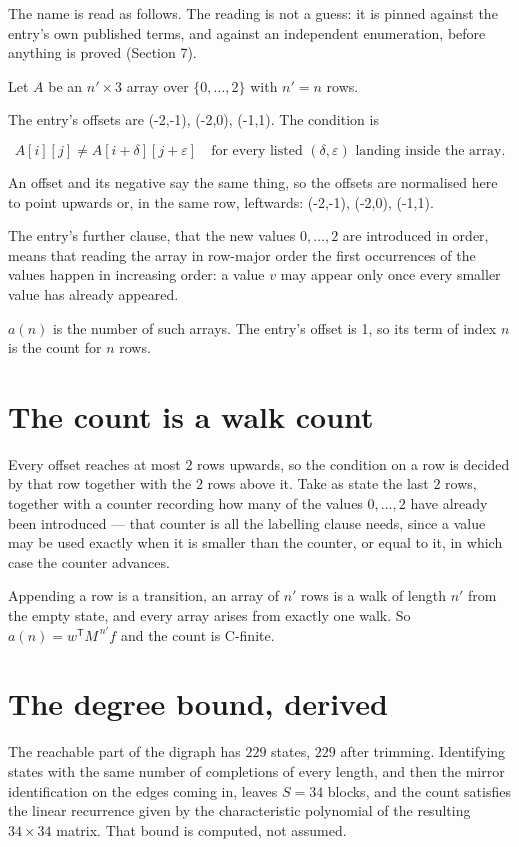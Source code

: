 \documentclass[11pt]{article}
\theoremstyle{definition}
\begin{document}
The name is read as follows. The reading is not a guess: it is pinned against the entry's own published terms, and against an independent enumeration, before anything is proved (Section 7).

Let $A$ be an $n' \times 3$ array over $\{0,\dots,2\}$ with $n' = n$ rows.

The entry's offsets are (-2,-1), (-2,0), (-1,1). The condition is

\[A[i][j] \ne A[i{+}\delta][j{+}\varepsilon]\quad\text{for every listed }(\delta,\varepsilon)\text{ landing inside the array.}\]

An offset and its negative say the same thing, so the offsets are normalised here to point upwards or, in the same row, leftwards: (-2,-1), (-2,0), (-1,1).

The entry's further clause, that the new values $0,\dots,2$ are introduced in order, means that reading the array in row-major order the first occurrences of the values happen in increasing order: a value $v$ may appear only once every smaller value has already appeared.

$a(n)$ is the number of such arrays. The entry's offset is 1, so its term of index $n$ is the count for $n$ rows.

\section{The count is a walk count}

Every offset reaches at most $2$ rows upwards, so the condition on a row is decided by that row together with the $2$ rows above it. Take as state the last $2$ rows, together with a counter recording how many of the values $0,\dots,2$ have already been introduced --- that counter is all the labelling clause needs, since a value may be used exactly when it is smaller than the counter, or equal to it, in which case the counter advances.

Appending a row is a transition, an array of $n'$ rows is a walk of length $n'$ from the empty state, and every array arises from exactly one walk. So $a(n) = w^{\mathsf T}M^{\,n'}f$ and the count is C-finite.

\section{The degree bound, derived}

The reachable part of the digraph has $229$ states, $229$ after trimming. Identifying states with the same number of completions of every length, and then the mirror identification on the edges coming in, leaves $S = 34$ blocks, and the count satisfies the linear recurrence given by the characteristic polynomial of the resulting $34\times34$ matrix. That bound is computed, not assumed.
\end{document}
